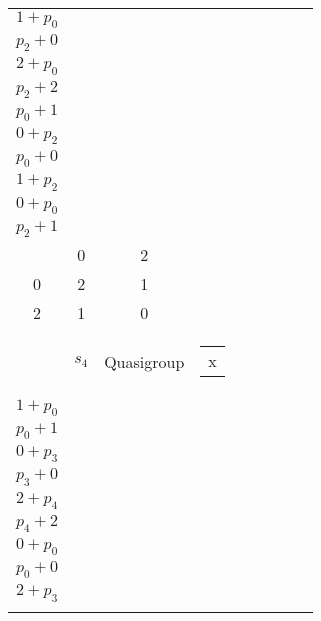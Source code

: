 \begin{longtable}{|c|c|c|c|c|c|c|c|c|}
\begin{tabular}{@{}c@{}}
    \\\hline
    \( 1 + p_{0} \)\\\hline
    \( p_{2} + 0 \)
\end{tabular} & \begin{tabular}{@{}c@{}}
    x\\\hline
    \( 2 + p_{0} \)\\\hline
    \( p_{2} + 2 \)
\end{tabular} & \begin{tabular}{@{}c@{}}
    \\\hline
    \( p_{0} + 1 \)\\\hline
    \( 0 + p_{2} \)
\end{tabular} & \begin{tabular}{@{}c@{}}
    \\\hline
    \( p_{0} + 0 \)\\\hline
    \( 1 + p_{2} \)
\end{tabular} & \begin{tabular}{@{}c@{}}
    \\\hline
    \( 0 + p_{0} \)\\\hline
    \( p_{2} + 1 \)
\end{tabular}\\\hline
    \( \begin{smallmatrix}
    1 & 0 & 2\\
    0 & 2 & 1\\
    2 & 1 & 0\\
\end{smallmatrix} \) & \( s_{4} \) & Quasigroup & \begin{tabular}{@{}c@{}}
    x
\end{tabular} & \begin{tabular}{@{}c@{}}
    \\\hline
    \( 1 + p_{0} \)\\\hline
    \( p_{0} + 1 \)\\\hline
    \( 0 + p_{3} \)\\\hline
    \( p_{3} + 0 \)\\\hline
    \( 2 + p_{4} \)\\\hline
    \( p_{4} + 2 \)
\end{tabular} & \begin{tabular}{@{}c@{}}
    \\\hline
    \( 0 + p_{0} \)\\\hline
    \( p_{0} + 0 \)\\\hline
    \( 2 + p_{3} \)\\\hline

\end{tabular}
\end{longtable}
